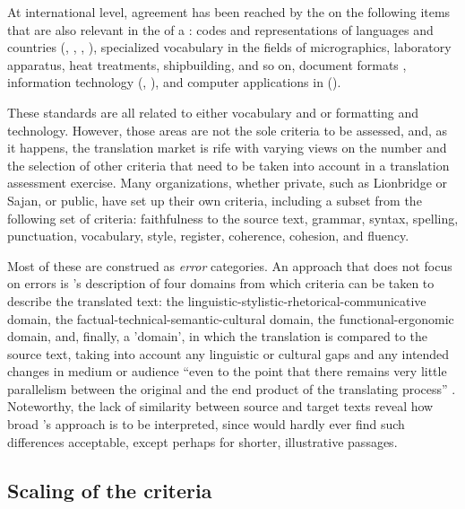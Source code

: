 \documentclass[output=paper]{langsci/langscibook}
\begin{document}
At international level, agreement has been reached by the  on the following items that are also relevant in the  of a : codes and representations of languages and countries (\citeauthor{ISO2016a}, \citeauthor{ISO2013}, \citeauthor{ISO2016b}, \citeauthor{ISO2006}),
specialized vocabulary in the fields of micrographics, laboratory apparatus, heat treatments, shipbuilding, and so on, document formats \citeauthor{ISO2004}, 
information technology (\citeauthor{ISO/IEC10646}, \citeauthor{ISO1991}),
and computer applications in  (\citeauthor{ISO2003}). 

These standards are all related to either vocabulary and  or formatting and technology. However, those areas are not the sole criteria to be assessed, and, as it happens, the translation market is rife with varying views on the number and the selection of other criteria that need to be taken into account in a translation assessment exercise. Many organizations, whether private, such as Lionbridge or Sajan, or public, have set up their own criteria, including a subset from the following set of criteria: faithfulness to the source text, grammar, syntax, spelling, punctuation, vocabulary, style, register, coherence, cohesion, and fluency. 

Most of these are construed as \textit{error} categories. An approach that does not focus on errors is \citeauthor{Gouadec2010}'s description of four domains from which criteria can be taken to describe the translated text: the linguistic-stylistic-rhe\-tor\-i\-cal-com\-municative domain, the factual-technical-semantic-cultural domain, the func\-tion\-al-ergonomic domain, and, finally, a 'domain', in which the translation is compared to the source text, taking into account any linguistic or cultural gaps and any intended changes in medium or audience ``even to the point that there remains very little parallelism between the original and the end product of the translating process'' \citep{Gouadec2010}. Noteworthy, the lack of similarity between source and target texts reveal how broad \citeauthor{Gouadec2010}'s approach is to be interpreted, since  would hardly ever find such differences acceptable, except perhaps for shorter, illustrative passages.

\subsection{Scaling of the criteria}\label{ref:4.1}
\end{document}
